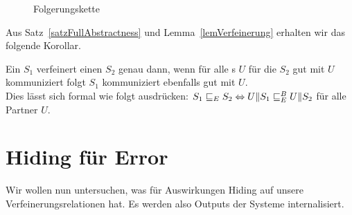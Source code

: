 \begin{figure}[h!tbp]
  \begin{center}
    \caption{Folgerungskette}
    \label{Folgerungskette}
  \end{center}
\end{figure}

Aus Satz~\ref{satzFullAbstractness} und Lemma~\ref{lemVerfeinerung} erhalten
wir das folgende Korollar.

\begin{kor}
  Ein \EIO{} $S_1$ verfeinert einen \EIO{} $S_2$ genau dann, wenn für alle \EIO{}s $U$
  für die $S_2$ gut mit $U$ kommuniziert folgt $S_1$ kommuniziert
  ebenfalls gut mit $U$.\\
  Dies lässt sich formal wie folgt ausdrücken: $S_1\sqsubseteq _E S_2
  \Leftrightarrow U\|S_1\sqsubseteq _E^B U\|S_2$ für alle Partner $U$.
\end{kor}

\section{Hiding für Error}

Wir wollen nun untersuchen, was für Auswirkungen Hiding auf unsere
Verfeinerungsrelationen hat. Es werden also Outputs der Systeme internalisiert.

